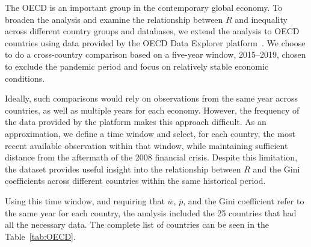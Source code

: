 \documentclass[12pt]{article}
\begin{document}
The OECD  is an important group in the contemporary global economy. To broaden the analysis and examine the relationship between $R$ and inequality across different country groups and databases, we extend the analysis to OECD countries using data provided by the OECD Data Explorer platform~\cite{OECD}.  We choose to do a cross-country comparison based on a five-year window, 2015--2019, chosen to exclude the pandemic period and focus on relatively stable economic conditions.

Ideally, such comparisons would rely on observations from the same year across countries, as well as multiple years for each economy. However, the frequency of the data provided by the platform makes this approach difficult. As an approximation, we define a time window and select, for each country, the most recent available observation within that window, while maintaining sufficient distance from the aftermath of the 2008 financial crisis. Despite this limitation, the dataset provides useful insight into the relationship between $R$ and the Gini coefficients across different countries within the same historical period.

Using this time window, and requiring that $\overline{w}$, $\overline{p}$, and the Gini coefficient refer to the same year for each country, the analysis included the 25 countries that had all the necessary data. The complete list of countries can be seen in the Table~\ref{tab:OECD}.
\end{document}
